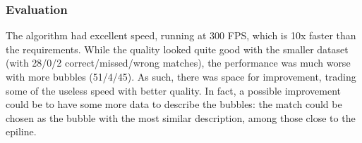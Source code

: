 \subsubsection{Evaluation}

The algorithm had excellent speed, running at 300 FPS, which is 10x faster than the requirements.
While the quality looked quite good with the smaller dataset (with 28/0/2 correct/missed/wrong matches), the performance was much worse with more bubbles (51/4/45).
As such, there was space for improvement, trading some of the useless speed with better quality.
In fact, a possible improvement could be to have some more data to describe the bubbles: the match could be chosen as the bubble with the most similar description, among those close to the epiline.

